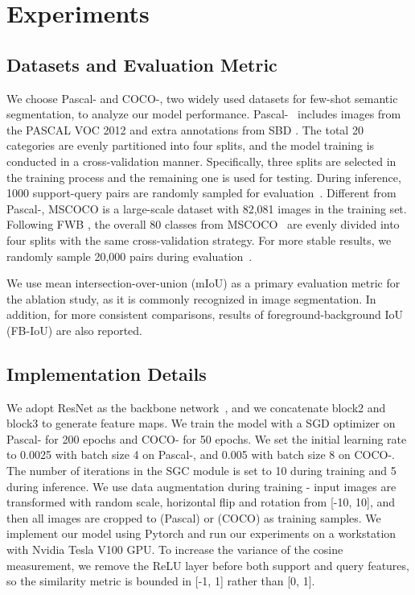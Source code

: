 \section{Experiments}
\subsection{Datasets and Evaluation Metric}
We choose Pascal- and COCO-, two widely used datasets for few-shot semantic segmentation, to analyze our model performance.
Pascal-~\cite{oslsm} includes images from the PASCAL VOC 2012 \cite{pascal} and extra annotations from SBD \cite{sbd}.
The total 20 categories are evenly partitioned into four splits, and the model training is conducted in a cross-validation manner.
Specifically, three splits are selected in the training process and the remaining one is used for testing.
During inference, 1000 support-query pairs are randomly sampled for evaluation~\cite{oslsm}.
Different from Pascal-, MSCOCO \cite{mscoco} is a large-scale dataset with 82,081 images 
in the training set.
Following FWB \cite{fwb}, the overall 80 classes from MSCOCO~\cite{mscoco} are evenly divided into four splits with the same cross-validation strategy.
For more stable results, we randomly sample 20,000 pairs during evaluation~\cite{pfenet}.

We use mean intersection-over-union (mIoU) 
as a primary evaluation metric for the ablation study, as it is commonly recognized in image segmentation.
In addition, for more consistent comparisons, results of foreground-background IoU (FB-IoU) are also reported.


\subsection{Implementation Details}
We adopt ResNet \cite{resnet} as the backbone network~\cite{canet},
and we concatenate block2 and block3 to generate feature maps.
We train the model 
with a SGD optimizer on Pascal- for 200 epochs and COCO- for 50 epochs.
We set the initial learning rate to 0.0025 with batch size 4 on Pascal-, and 0.005 with batch size 8 on COCO-.
The number of iterations in the SGC module is set to 10 during training and 5 during inference. We use data augmentation during training - input images are transformed with random scale, horizontal flip and rotation from [-10, 10], and then all images are cropped to  (Pascal) or  (COCO) as training samples.
We implement our model using Pytorch and run our experiments on a workstation with Nvidia Tesla V100 GPU.
To increase the variance of the cosine measurement, we remove the ReLU layer before both support and query features, so the similarity metric is bounded in [-1, 1] rather than [0, 1].

